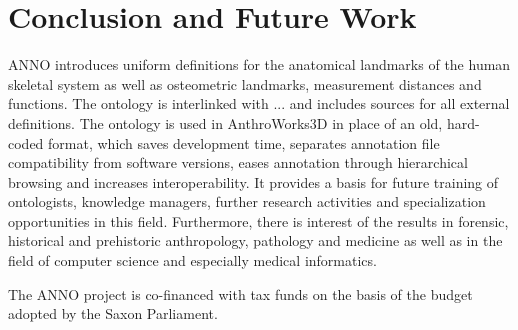 \documentclass[sw]{iosart2x}
\newcommand{\aw}{AnthroWorks3D}
\begin{document}
\section{Conclusion and Future Work}
ANNO introduces uniform definitions for the anatomical landmarks of the human skeletal system as well as osteometric landmarks, measurement distances and functions.
The ontology is interlinked with ... and includes sources for all external definitions.
The ontology is used in \aw{} in place of an old, hard-coded format, which saves development time, separates annotation file compatibility from software versions, eases annotation through hierarchical browsing and increases interoperability.
It provides a basis for future training of ontologists, knowledge managers, further research activities and specialization opportunities in this field.
Furthermore, there is interest of the results in forensic, historical and prehistoric anthropology, pathology and medicine as well as in the field of computer science and especially medical informatics.



\begin{ack}
The ANNO project is co-financed with tax funds on the basis of the budget adopted by the Saxon Parliament.
\end{ack}

\nocite{*}


\end{document}
